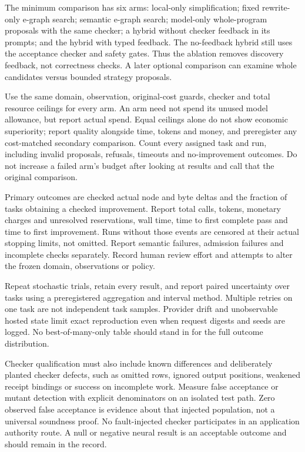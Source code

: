 \documentclass[11pt]{article}
\begin{document}
The minimum comparison has six arms: local-only simplification; fixed rewrite-only e-graph search; semantic e-graph search; model-only whole-program proposals with the same checker; a hybrid without checker feedback in its prompts; and the hybrid with typed feedback. The no-feedback hybrid still uses the acceptance checker and safety gates. Thus the ablation removes discovery feedback, not correctness checks. A later optional comparison can examine whole candidates versus bounded strategy proposals.

Use the same domain, observation, original-cost guards, checker and total resource ceilings for every arm. An arm need not spend its unused model allowance, but report actual spend. Equal ceilings alone do not show economic superiority; report quality alongside time, tokens and money, and preregister any cost-matched secondary comparison. Count every assigned task and run, including invalid proposals, refusals, timeouts and no-improvement outcomes. Do not increase a failed arm's budget after looking at results and call that the original comparison.

Primary outcomes are checked actual node and byte deltas and the fraction of tasks obtaining a checked improvement. Report total calls, tokens, monetary charges and unresolved reservations, wall time, time to first complete pass and time to first improvement. Runs without those events are censored at their actual stopping limits, not omitted. Report semantic failures, admission failures and incomplete checks separately. Record human review effort and attempts to alter the frozen domain, observations or policy.

Repeat stochastic trials, retain every result, and report paired uncertainty over tasks using a preregistered aggregation and interval method. Multiple retries on one task are not independent task samples. Provider drift and unobservable hosted state limit exact reproduction even when request digests and seeds are logged. No best-of-many-only table should stand in for the full outcome distribution.

Checker qualification must also include known differences and deliberately planted checker defects, such as omitted rows, ignored output positions, weakened receipt bindings or success on incomplete work. Measure false acceptance or mutant detection with explicit denominators on an isolated test path. Zero observed false acceptance is evidence about that injected population, not a universal soundness proof. No fault-injected checker participates in an application authority route. A null or negative neural result is an acceptable outcome and should remain in the record.
\end{document}
